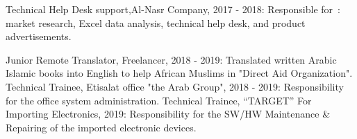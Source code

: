 



\begin{cvskills}
  \cvskill
    {\scriptsize Technical Help Desk support,Al-Nasr Company, 2017 - 2018:} %
    {\scriptsize Responsible for\ : market research, Excel data analysis, technical help desk, and product advertisements.} %

  \cvskill
    {\scriptsize Junior Remote Translator, Freelancer, 2018 - 2019: } %
    {\scriptsize Translated written Arabic Islamic books into English to help African Muslims in "Direct Aid Organization".} %
  \cvskill
    {\scriptsize Technical Trainee, Etisalat office "the Arab Group", 2018 - 2019:} %
    {\scriptsize Responsibility for the office system administration.} %
  \cvskill
    {\scriptsize Technical Trainee, “TARGET” For Importing Electronics, 2019: } %
    {\scriptsize Responsibility for the SW/HW Maintenance \& Repairing of the imported electronic devices.} %
    
\end{cvskills}

 

